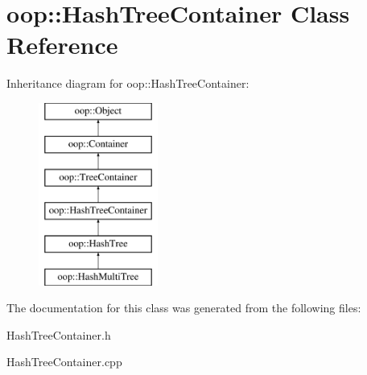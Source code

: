 \hypertarget{classoop_1_1HashTreeContainer}{\section{oop\-:\-:\-Hash\-Tree\-Container \-Class \-Reference}
\label{classoop_1_1HashTreeContainer}
}
\-Inheritance diagram for oop\-:\-:\-Hash\-Tree\-Container\-:\begin{figure}[H]
\begin{center}
\leavevmode
\includegraphics[height=6.000000cm]{classoop_1_1HashTreeContainer}
\end{center}
\end{figure}


\-The documentation for this class was generated from the following files\-:\begin{DoxyCompactItemize}
\item 
\-Hash\-Tree\-Container.\-h\item 
\-Hash\-Tree\-Container.\-cpp\end{DoxyCompactItemize}
